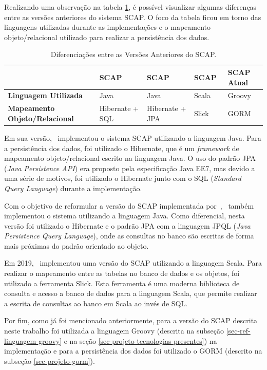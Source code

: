 Realizando uma observação na tabela \ref{tabela-diferenciacoes-versoes-anteriores-scap}, é possível visualizar algumas diferenças entre as versões anteriores do sistema SCAP. O foco da tabela ficou em torno das linguagens utilizadas durante as implementações e o mapeamento objeto/relacional utilizado para realizar a persistência dos dados.

\begin{table}[h]
	\centering	
	\vspace{0.5cm}
	\footnotesize
	\caption{Diferenciações entre as Versões Anteriores do SCAP.}	
	\label{tabela-diferenciacoes-versoes-anteriores-scap}
	\begin{tabular}{|p{2.5cm}|p{3cm}|p{3cm}|p{3cm}|p{2.5cm}|}  \hline 
 		
 		\rowcolor[rgb]{0.8,0.8,0.8} & \textbf{SCAP}~\cite{duarte-pg14} & \textbf{SCAP}~\cite{prado-pg15} & \textbf{SCAP}~\cite{guterres-pg19} & \textbf{SCAP Atual} \\\hline 
		
		\textbf{Linguagem Utilizada} & Java & Java & Scala & Groovy \\\hline
		
		\textbf{Mapeamento Objeto/Relacional} & Hibernate + SQL & Hibernate + JPA & Slick & GORM \\\hline
		
	\end{tabular}
\end{table}

Em sua versão,~ implementou o sistema SCAP utilizando a linguagem Java. Para a persistência dos dados, foi utilizado o Hibernate, que é um \textit{framework} de mapeamento objeto/relacional escrito na linguagem Java. O uso do padrão JPA (\textit{Java Persistence API}) era proposto pela especificação Java EE7, mas devido a uma série de motivos, foi utilizado o Hibernate  junto com o SQL (\textit{Standard Query Language}) durante a implementação.

Com o objetivo de reformular a versão do SCAP implementada por~,~ também implementou o sistema utilizando a linguagem Java. Como diferencial, nesta versão foi utilizado o Hibernate e o padrão JPA com a linguagem JPQL (\textit{Java Persistence Query Language}), onde as consultas no banco são escritas de forma mais próximas do padrão orientado ao objeto.

Em 2019,~\cite{guterres-pg19} implementou uma versão do SCAP utilizando a linguagem Scala. Para realizar o mapeamento entre as tabelas no banco de dados e os objetos, foi utilizado a ferramenta Slick. Esta ferramenta é uma moderna biblioteca de consulta e acesso a banco de dados para a linguagem Scala, que permite realizar a escrita de consultas ao banco em Scala ao invés de SQL.

Por fim, como já foi mencionado anteriormente, para a versão do SCAP descrita neste trabalho foi utilizada a linguagem Groovy (descrita na subseção \ref{sec-ref-linguagem-groovy} e na seção \ref{sec-projeto-tecnologias-presentes}) na implementação e para a persistência dos dados foi utilizado o GORM (descrito na subseção \ref{sec-projeto-gorm}).       